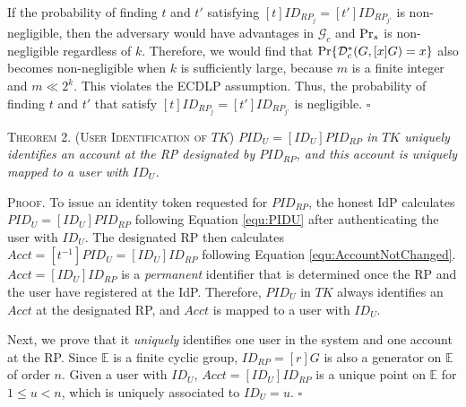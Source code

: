 \newc
If the probability of finding $t$ and $t'$ satisfying $[t]ID_{RP_j} = [t']ID_{RP_{j'}}$ is non-negligible,
 then the adversary would have advantages in $\mathcal{G}_c$ and ${\rm Pr}_s$ is non-negligible regardless of $k$.
Therefore, we would find that ${\rm Pr}\{\mathcal{D}^*_c(G, [x]G)=x\}$ also becomes non-negligible  when $k$ is sufficiently large, because $m$ is a finite integer and $m \ll 2^k$.
\oldc
This violates the ECDLP assumption. Thus, the probability of finding $t$ and $t'$ that satisfy $[t]ID_{RP_j} = [t']ID_{RP_{j'}}$ is negligible. \hfill $\square$


\newc
\vspace{3mm}
\noindent\textsc{Theorem 2. (User Identification of $TK$)} {\em $PID_U= [ID_U]PID_{RP}$ in $TK$ uniquely identifies an account at the RP designated by $PID_{RP}$, and this account is uniquely mapped to a user with $ID_U$.}


\vspace{0.75mm}
\noindent\textsc{Proof.}
To issue an identity token requested for $PID_{RP}$, the honest IdP calculates $PID_U = [ID_U]PID_{RP}$ following Equation \ref{equ:PIDU} after authenticating the user with $ID_U$. The designated RP then calculates $Acct = [t^{-1}]PID_{U} = [ID_U]ID_{RP}$ following Equation \ref{equ:AccountNotChanged}.
$Acct = [ID_U]ID_{RP}$ is a \emph{permanent} identifier that is determined once the RP and the user have registered at the IdP. Therefore, $PID_U$ in $TK$ always identifies an $Acct$ at the designated RP, and $Acct$ is mapped to a user with $ID_U$.

Next, we prove that it \emph{uniquely} identifies one user in the system and one account at the RP. Since $\mathbb{E}$ is a finite cyclic group, $ID_{RP} = [r]G$ is also a generator on $\mathbb{E}$ of order $n$. Given a user with $ID_U$, $Acct = [ID_U]ID_{RP}$ is a unique point on $\mathbb{E}$ for $1 \leq u < n$, which is uniquely associated to $ID_U=u$. \hfill $\square$


